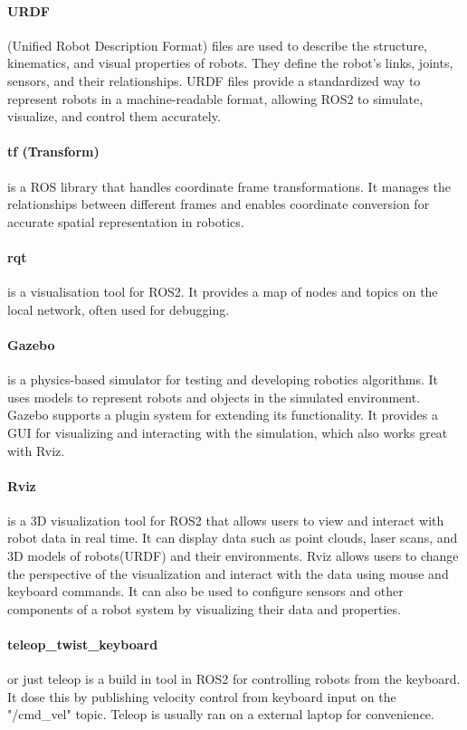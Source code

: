 \paragraph{URDF} (Unified Robot Description Format) files are used to describe the structure, kinematics, and visual properties of robots. They define the robot's links, joints, sensors, and their relationships. URDF files provide a standardized way to represent robots in a machine-readable format, allowing ROS2 to simulate, visualize, and control them accurately.

\paragraph{tf (Transform)} is a ROS library that handles coordinate frame transformations. It manages the relationships between different frames and enables coordinate conversion for accurate spatial representation in robotics.

\paragraph{rqt} is a visualisation tool for ROS2. It provides a map of nodes and topics on the local network, often used for debugging. 

\paragraph{Gazebo} is a physics-based simulator for testing and developing robotics algorithms. It uses models to represent robots and objects in the simulated environment. Gazebo supports a plugin system for extending its functionality. It provides a GUI for visualizing and interacting with the simulation, which also works great with Rviz.

\paragraph{Rviz} is a 3D visualization tool for ROS2 that allows users to view and interact with robot data in real time. It can display data such as point clouds, laser scans, and 3D models of robots(URDF) and their environments. Rviz allows users to change the perspective of the visualization and interact with the data using mouse and keyboard commands. It can also be used to configure sensors and other components of a robot system by visualizing their data and properties. 

\paragraph{teleop\_twist\_keyboard} or just teleop is a build in tool in ROS2 for controlling robots from the keyboard. It dose this by publishing velocity control from keyboard input on the "/cmd\_vel" topic. Teleop is usually ran on a external laptop for convenience.   

